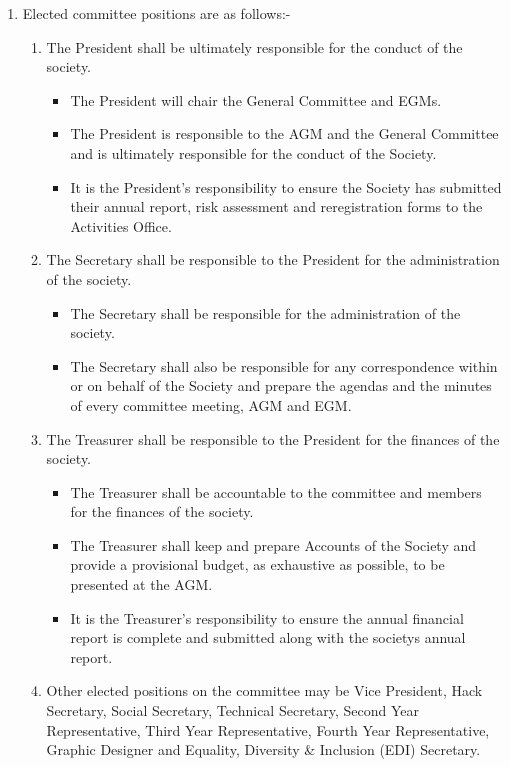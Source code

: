 \begin {enumerate}
  \item Elected committee positions are as follows:-
    \begin{enumerate}
      \item The President shall be ultimately responsible for the conduct of the society.
        \begin{itemize}
          \item The President will chair the General Committee and EGMs.
          \item The President is responsible to the AGM and the General Committee and is ultimately responsible for the conduct of the Society.
          \item It is the President’s responsibility to ensure the Society has submitted their annual report, risk assessment and reregistration forms to the Activities Office.
        \end{itemize}
      \item The Secretary shall be responsible to the President for the administration of the society.
        \begin{itemize}
          \item The Secretary shall be responsible for the administration of the society.
          \item The Secretary shall also be responsible for any correspondence within or on behalf of the Society and prepare the agendas and the minutes of every committee meeting, AGM and EGM.
        \end{itemize}
      \item The Treasurer shall be responsible to the President for the finances of the society.
        \begin{itemize}
          \item The Treasurer shall be accountable to the committee and members for the finances of the society.
          \item The Treasurer shall keep and prepare Accounts of the Society and provide a provisional budget, as exhaustive as possible, to be presented at the AGM.
          \item It is the Treasurer’s responsibility to ensure the annual financial report is complete and submitted along with the society\textquotesingle s annual report.
        \end{itemize}
      \item Other elected positions on the committee may be Vice President, Hack Secretary, Social
        Secretary, Technical Secretary, Second Year Representative,
        Third Year Representative, Fourth Year Representative, Graphic Designer and Equality, Diversity & Inclusion (EDI) Secretary.
    \end{enumerate}


\end{enumerate}

